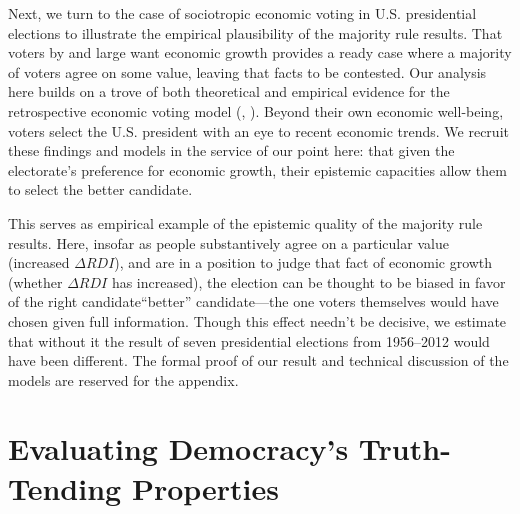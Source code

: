 \documentclass[11pt]{article}
\begin{document}
Next, we turn to the case of sociotropic economic voting in U.S. presidential elections to illustrate the empirical plausibility of the majority rule results. That voters by and large want economic growth provides a ready case where a majority of voters agree on some value, leaving that facts to be contested.
 Our analysis here builds on a trove of both theoretical and empirical evidence for the retrospective economic voting model (\cite{Duch2008}, \cite{Revisited09}). Beyond their own economic well-being, voters select the U.S. president with an eye to  recent economic trends. We recruit these findings and models in the service of our point here: that given the electorate's preference for economic growth, their epistemic capacities allow them to select the better candidate.
 


This serves as empirical example of the epistemic quality of the majority rule results. Here, insofar as people substantively agree on a particular value (increased $\Delta RDI$), and are in a position to judge that fact of economic growth (whether $\Delta RDI$ has increased), the election can be thought to be biased in favor of the right candidate``better'' candidate---the one voters themselves would have chosen given full information. %
Though this effect needn't be decisive, we estimate that without it the result of seven presidential elections from 1956--2012 would have been different. The formal proof of our result and technical discussion of the models are reserved for the appendix.


\section{Evaluating Democracy's Truth-Tending Properties}\label{sec:theory}
\end{document}
